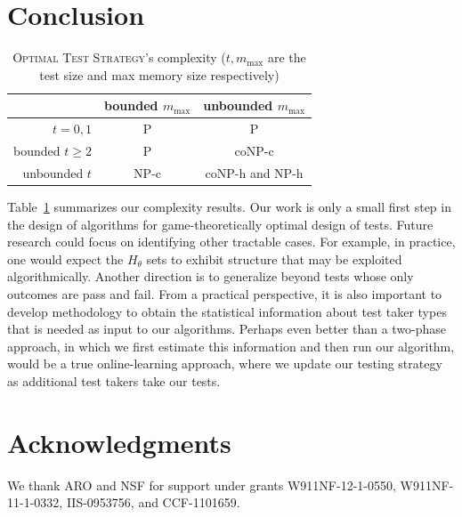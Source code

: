 \documentclass{article}
\begin{document}
\section{Conclusion}

\begin{table}
\begin{tabular}{r | c | c }
	& bounded $m_\text{max}$ & unbounded $m_\text{max}$ \\
	\hline
$t=0,1$ & P & P \\
bounded $t \geq 2$ & P & coNP-c\\
unbounded $t$ & NP-c & coNP-h and NP-h
\end{tabular}
\caption{\textsc{Optimal Test
Strategy}'s complexity ($t, m_{\max}$ are the test size and max memory size respectively)}
\label{tab:results}
\end{table}

Table~\ref{tab:results} summarizes our complexity results.
Our work is only a small first step in the design of algorithms for
game-theoretically optimal design of tests.  Future research could
focus on identifying other tractable cases.  For example, in practice,
one would expect the $H_\theta$ sets to exhibit structure that may be
exploited algorithmically.  
Another direction is to generalize beyond tests whose only outcomes
are pass and fail.
From a practical perspective, it is also
important to develop methodology to obtain the statistical information
about test taker types that is needed as input to our algorithms.
Perhaps even better than a two-phase approach, in which we first
estimate this information and then run our algorithm, would be a true
online-learning approach, where we update our testing strategy as
additional test takers take our tests.

\section*{Acknowledgments}
We thank ARO and NSF for support under grants W911NF-12-1-0550,
W911NF-11-1-0332, IIS-0953756, and CCF-1101659.
\end{document}
